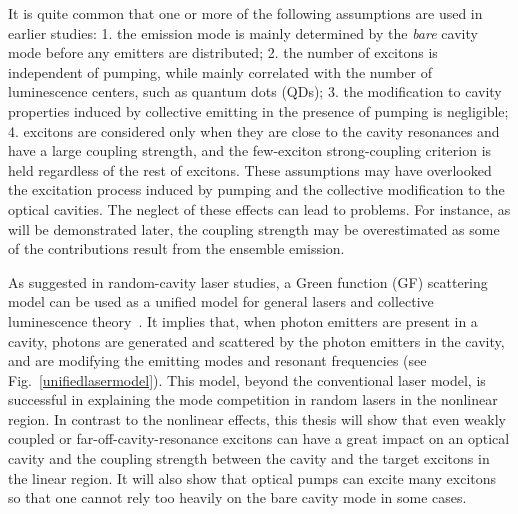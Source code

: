 It is quite common that one or more of the following assumptions are used in earlier studies: 1. the emission mode is mainly determined by the {\it bare} cavity mode before any emitters are distributed; 2.  the number of excitons is independent of pumping, while mainly correlated with the number of luminescence centers, such as quantum dots (QDs); 3. the modification to cavity properties induced by collective emitting in the presence of pumping is negligible; 4. excitons are considered only when they are close to the cavity resonances and have a large coupling strength, and the few-exciton strong-coupling criterion is held regardless of the rest of excitons. These assumptions may have overlooked the excitation process induced by pumping and the collective modification to the optical cavities. The neglect of these effects can lead to problems. For instance, as will be demonstrated later, the coupling strength may be overestimated as some of the contributions result from the ensemble emission.





As suggested in random-cavity laser studies, a Green function (GF) scattering model can be used as a unified model for general lasers and collective luminescence theory~\cite{Tureci2008,Bravo-Abad2008}.
It implies that, when photon emitters are present in a cavity, photons are generated and scattered by the photon emitters in the cavity, and are modifying the emitting modes and resonant frequencies (see Fig.~\ref{unifiedlasermodel}).
This model, beyond the conventional laser model, is successful in explaining the mode competition in random lasers in the nonlinear region.
In contrast to the nonlinear effects, this thesis will show that even weakly coupled or far-off-cavity-resonance excitons can have a great impact on an optical cavity and the coupling strength between the cavity and the target excitons in the linear region.
It will also show that optical pumps can excite many excitons so that one cannot rely too heavily on the bare cavity mode in some cases.


